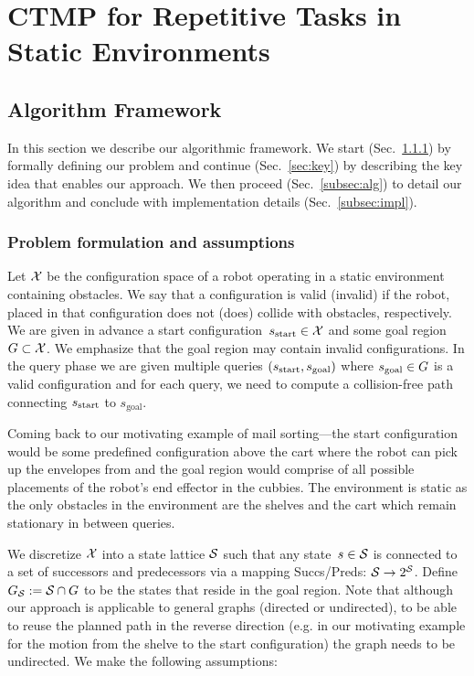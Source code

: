 \documentclass[a4paper,10pt]{article}
\begin{document}
\section{CTMP for Repetitive Tasks in Static Environments}
\subsection{Algorithm Framework}
\label{sec:alg}
In this section we describe our algorithmic framework. We start (Sec.~\ref{sec:pdef}) by formally defining our problem and continue (Sec.~\ref{sec:key}) by describing the key idea that enables our approach.
We then proceed (Sec.~\ref{subsec:alg}) to detail our algorithm and conclude with implementation details (Sec.~\ref{subsec:impl}).

\subsubsection{Problem formulation and assumptions}
\label{sec:pdef}
Let $\mathcal{X}$ be the configuration space of a robot operating in a static environment containing obstacles.
We say that a configuration is valid (invalid) if the robot, placed in that configuration does not (does) collide with obstacles, respectively.
We are given in advance a start configuration~$s_{\textrm{start}} \in \mathcal{X}$ and some goal region~$G \subset \mathcal{X}$.
We emphasize that the goal region may contain invalid configurations.
In the query phase we are given multiple queries $(s_{\textrm{start}}, s_{\text{goal}})$ where $s_{\rm goal} \in G$ is a valid configuration and for each query, we need to compute a collision-free path connecting $s_{\textrm{start}}$ to $s_{\text{goal}}$.

Coming back to our motivating example of mail sorting---the start configuration would be some predefined configuration above the cart where the robot can pick up the envelopes from and the goal region would comprise of all possible placements of the robot's end effector in the cubbies. The environment is static as the only obstacles in the environment are the shelves and the cart which remain stationary in between queries.

We discretize $\mathcal{X}$ into a state lattice $\mathcal{S}$ such that any state~$s \in \mathcal{S}$ is connected to a set of successors and predecessors via a mapping Succs/Preds: $\mathcal{S} \rightarrow 2^\mathcal{S}$.
Define $G_\mathcal{S} := \mathcal{S} \cap G$ to be the states that reside in the goal region. Note that although our approach is applicable to general graphs (directed or undirected), to be able to reuse the planned path in the reverse direction (e.g. in our motivating example for the motion from the shelve to the start configuration) the graph needs to be undirected.
We make the following assumptions:
\end{document}
